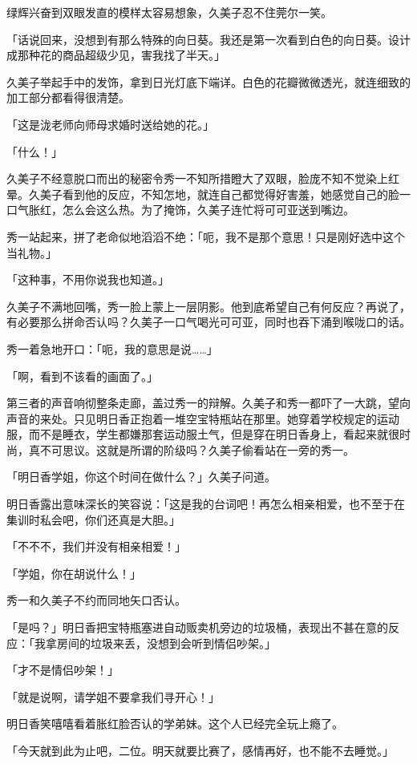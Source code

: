 \documentclass[UTF8]{ctexart}
\begin{document}
    绿辉兴奋到双眼发直的模样太容易想象，久美子忍不住莞尔一笑。 

    「话说回来，没想到有那么特殊的向日葵。我还是第一次看到白色的向日葵。设计成那种花的商品超级少见，害我找了半天。」 

    久美子举起手中的发饰，拿到日光灯底下端详。白色的花瓣微微透光，就连细致的加工部分都看得很清楚。 

    「这是泷老师向师母求婚时送给她的花。」 

    「什么！」 

    久美子不经意脱口而出的秘密令秀一不知所措瞪大了双眼，脸庞不知不觉染上红晕。久美子看到他的反应，不知怎地，就连自己都觉得好害羞，她感觉自己的脸一口气胀红，怎么会这么热。为了掩饰，久美子连忙将可可亚送到嘴边。 

    秀一站起来，拼了老命似地滔滔不绝：「呃，我不是那个意思！只是刚好选中这个当礼物。」 

    「这种事，不用你说我也知道。」 

    久美子不满地回嘴，秀一脸上蒙上一层阴影。他到底希望自己有何反应？再说了，有必要那么拼命否认吗？久美子一口气喝光可可亚，同时也吞下涌到喉咙口的话。 

    秀一着急地开口：「呃，我的意思是说……」 

    「啊，看到不该看的画面了。」 

    第三者的声音响彻整条走廊，盖过秀一的辩解。久美子和秀一都吓了一大跳，望向声音的来处。只见明日香正抱着一堆空宝特瓶站在那里。她穿着学校规定的运动服，而不是睡衣，学生都嫌那套运动服土气，但是穿在明日香身上，看起来就很时尚，真不可思议。这就是所谓的阶级吗？久美子偷看站在一旁的秀一。 

    「明日香学姐，你这个时间在做什么？」久美子问道。 

    明日香露出意味深长的笑容说：「这是我的台词吧！再怎么相亲相爱，也不至于在集训时私会吧，你们还真是大胆。」 

    「不不不，我们并没有相亲相爱！」 

    「学姐，你在胡说什么！」 

    秀一和久美子不约而同地矢口否认。 

    「是吗？」明日香把宝特瓶塞进自动贩卖机旁边的垃圾桶，表现出不甚在意的反应：「我拿房间的垃圾来丢，没想到会听到情侣吵架。」 

    「才不是情侣吵架！」 

    「就是说啊，请学姐不要拿我们寻开心！」 

    明日香笑嘻嘻看着胀红脸否认的学弟妹。这个人已经完全玩上瘾了。 

    「今天就到此为止吧，二位。明天就要比赛了，感情再好，也不能不去睡觉。」 
\end{document}
